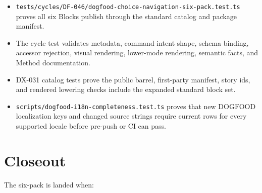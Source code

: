 \begin{itemize}
\tightlist
\item
  \texttt{t\allowbreak{}e\allowbreak{}s\allowbreak{}t\allowbreak{}s\allowbreak{}/\allowbreak{}c\allowbreak{}y\allowbreak{}c\allowbreak{}l\allowbreak{}e\allowbreak{}s\allowbreak{}/\allowbreak{}D\allowbreak{}F\allowbreak{}-\allowbreak{}0\allowbreak{}4\allowbreak{}6\allowbreak{}/\allowbreak{}d\allowbreak{}o\allowbreak{}g\allowbreak{}f\allowbreak{}o\allowbreak{}o\allowbreak{}d\allowbreak{}-\allowbreak{}c\allowbreak{}h\allowbreak{}o\allowbreak{}i\allowbreak{}c\allowbreak{}e\allowbreak{}-\allowbreak{}n\allowbreak{}a\allowbreak{}v\allowbreak{}i\allowbreak{}g\allowbreak{}a\allowbreak{}t\allowbreak{}i\allowbreak{}o\allowbreak{}n\allowbreak{}-\allowbreak{}s\allowbreak{}i\allowbreak{}x\allowbreak{}-\allowbreak{}p\allowbreak{}a\allowbreak{}c\allowbreak{}k\allowbreak{}.\allowbreak{}t\allowbreak{}e\allowbreak{}s\allowbreak{}t\allowbreak{}.\allowbreak{}t\allowbreak{}s} proves all six Blocks publish through the standard catalog and package manifest.
\item
  The cycle test validates metadata, command intent shape, schema binding, accessor rejection, visual rendering, lower-mode rendering, semantic facts, and Method documentation.
\item
  DX-031 catalog tests prove the public barrel, first-party manifest, story ids, and rendered lowering checks include the expanded standard block set.
\item
  \texttt{s\allowbreak{}c\allowbreak{}r\allowbreak{}i\allowbreak{}p\allowbreak{}t\allowbreak{}s\allowbreak{}/\allowbreak{}d\allowbreak{}o\allowbreak{}g\allowbreak{}f\allowbreak{}o\allowbreak{}o\allowbreak{}d\allowbreak{}-\allowbreak{}i\allowbreak{}1\allowbreak{}8\allowbreak{}n\allowbreak{}-\allowbreak{}c\allowbreak{}o\allowbreak{}m\allowbreak{}p\allowbreak{}l\allowbreak{}e\allowbreak{}t\allowbreak{}e\allowbreak{}n\allowbreak{}e\allowbreak{}s\allowbreak{}s\allowbreak{}.\allowbreak{}t\allowbreak{}e\allowbreak{}s\allowbreak{}t\allowbreak{}.\allowbreak{}t\allowbreak{}s} proves that new DOGFOOD localization keys and changed source strings require current rows for every supported locale before pre-push or CI can pass.
\end{itemize}

\section{Closeout}\label{record-096-closeout}

The six-pack is landed when:

